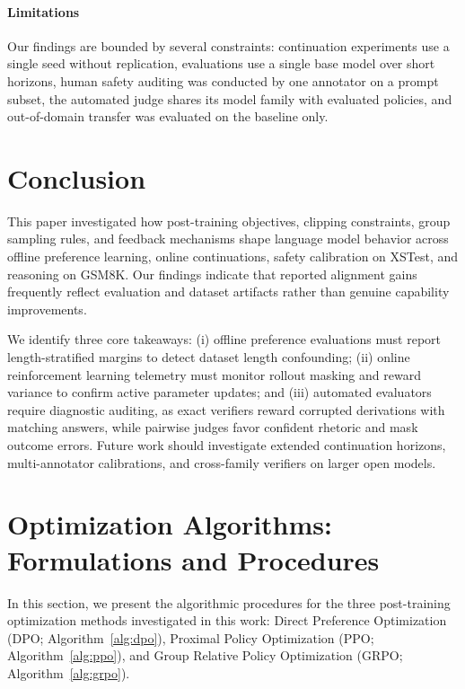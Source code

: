 \documentclass{article}
\begin{document}
\paragraph{Limitations}
Our findings are bounded by several constraints: continuation experiments use a single seed without replication, evaluations use a single base model over short horizons, human safety auditing was conducted by one annotator on a prompt subset, the automated judge shares its model family with evaluated policies, and out-of-domain transfer was evaluated on the baseline only.

\section{Conclusion}
\label{sec:conclusion}

This paper investigated how post-training objectives, clipping constraints, group sampling rules, and feedback mechanisms shape language model behavior across offline preference learning, online continuations, safety calibration on XSTest, and reasoning on GSM8K. Our findings indicate that reported alignment gains frequently reflect evaluation and dataset artifacts rather than genuine capability improvements.

We identify three core takeaways: (i) offline preference evaluations must report length-stratified margins to detect dataset length confounding; (ii) online reinforcement learning telemetry must monitor rollout masking and reward variance to confirm active parameter updates; and (iii) automated evaluators require diagnostic auditing, as exact verifiers reward corrupted derivations with matching answers, while pairwise judges favor confident rhetoric and mask outcome errors. Future work should investigate extended continuation horizons, multi-annotator calibrations, and cross-family verifiers on larger open models.

\newpage

{
\small

\nocite{*}
 
}

\newpage

\appendix

\section{Optimization Algorithms: Formulations and Procedures}
\label{app:algorithms}

In this section, we present the algorithmic procedures for the three post-training optimization methods investigated in this work: Direct Preference Optimization (DPO; Algorithm~\ref{alg:dpo}), Proximal Policy Optimization (PPO; Algorithm~\ref{alg:ppo}), and Group Relative Policy Optimization (GRPO; Algorithm~\ref{alg:grpo}).
\end{document}
